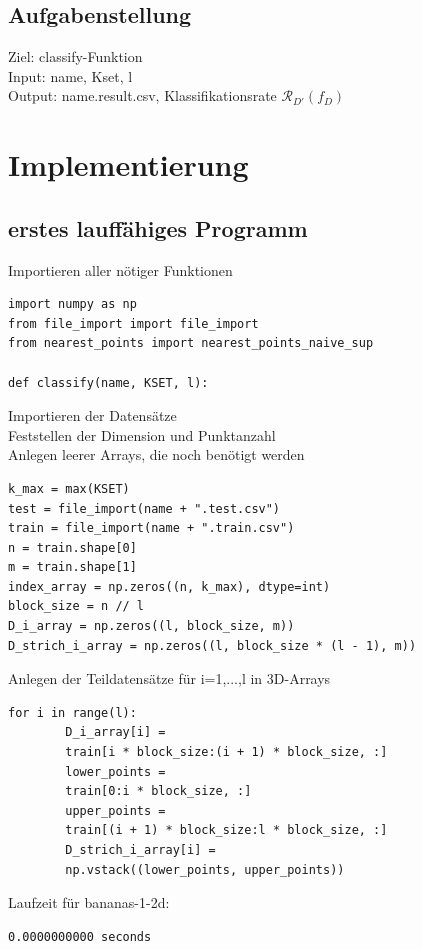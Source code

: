 \documentclass{beamer}
\begin{document}
\subsection{Aufgabenstellung}
\begin{frame}
Ziel: classify-Funktion\\
Input: name, Kset, l \\
Output: name.result.csv, Klassifikationsrate $\mathcal{R}_{D'}(f_{D})$ \\
\vspace{20 mm}
\end{frame}



\section{Implementierung}




\subsection{erstes lauffähiges Programm}

\begin{frame}[fragile]
Importieren aller nötiger Funktionen
\begin{verbatim}
import numpy as np
from file_import import file_import
from nearest_points import nearest_points_naive_sup

def classify(name, KSET, l):
\end{verbatim}
\end{frame}

\begin{frame}[fragile]
Importieren der Datensätze\\
Feststellen der Dimension und Punktanzahl\\
Anlegen leerer Arrays, die noch benötigt werden\\
\begin{verbatim}
k_max = max(KSET)
test = file_import(name + ".test.csv")  
train = file_import(name + ".train.csv")  
n = train.shape[0]  
m = train.shape[1] 
index_array = np.zeros((n, k_max), dtype=int)  
block_size = n // l  
D_i_array = np.zeros((l, block_size, m))  
D_strich_i_array = np.zeros((l, block_size * (l - 1), m))  
\end{verbatim}
\end{frame}

\begin{frame}[fragile]
Anlegen der Teildatensätze für i=1,...,l in 3D-Arrays
\begin{verbatim}
for i in range(l):
        D_i_array[i] = 
        train[i * block_size:(i + 1) * block_size, :]
        lower_points = 
        train[0:i * block_size, :]
        upper_points = 
        train[(i + 1) * block_size:l * block_size, :]
        D_strich_i_array[i] =
        np.vstack((lower_points, upper_points))
\end{verbatim}
Laufzeit für bananas-1-2d:
\begin{verbatim}
0.0000000000 seconds
\end{verbatim}
\end{frame}
\end{document}
